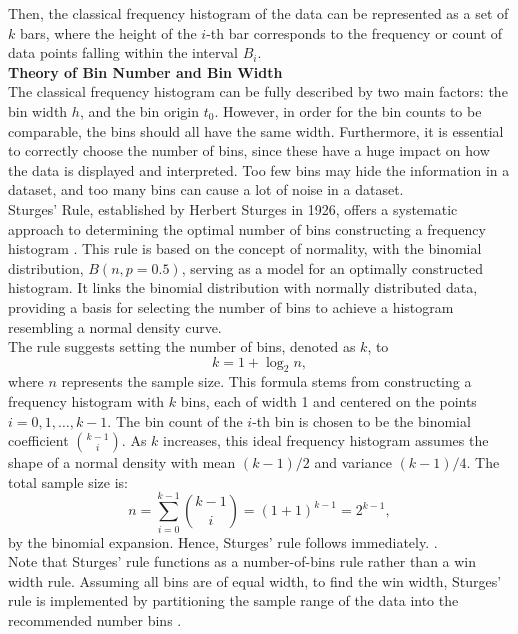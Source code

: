 \documentclass{article}\usepackage[]{graphicx}\usepackage[]{xcolor}
\numberwithin{equation}{section}
\begin{document}
\noindent Then, the classical frequency histogram of the data can be represented as a set of $k$ bars, where the height of the $i$-th bar corresponds to the frequency or count of data points falling within the interval $B_i$.\\

\noindent \textbf{Theory of Bin Number and Bin Width}\\
\noindent The classical frequency histogram can be fully described by two main factors: the bin width $h$, and the bin origin $t_{0}$. However, in order for the bin counts to be comparable, the bins should all have the same width. Furthermore, it is essential to correctly choose the number of bins, since these have a huge impact on how the data is displayed and interpreted. Too few bins may hide the information in a dataset, and too many bins can cause a lot of noise in a dataset.\\

\noindent Sturges' Rule, established by Herbert Sturges in 1926, offers a systematic approach to determining the optimal number of bins constructing a frequency histogram \cite{scott2015multivariate}. This rule is based on the concept of normality, with the binomial distribution, $B(n,p = 0.5)$, serving as a model for an optimally constructed histogram. It links the binomial distribution with normally distributed data, providing a basis for selecting the number of bins to achieve a histogram resembling a normal density curve.\\

\noindent The rule suggests setting the number of bins, denoted as $k$, to \[ k = 1 + \log_{2} n, \] where $n$ represents the sample size. This formula stems from constructing a frequency histogram with $k$ bins, each of width 1 and centered on the points $i = 0,1,\dots, k - 1$. The bin count of the $i$-th bin is chosen to be the binomial coefficient $\binom{k-1}{i}$. As $k$ increases, this ideal frequency histogram assumes the shape of a normal density with mean $(k - 1)/2$ and variance $(k - 1)/4$. The total sample size is:
\[ n = \sum_{i=0}^{k-1} \binom{k-1}{i} = (1+1)^{k-1} = 2^{k-1}, \]
by the binomial expansion. Hence, Sturges’ rule follows immediately. \cite{scott2015multivariate}.\\

\noindent Note that Sturges’ rule functions as a number-of-bins rule rather than a win  width rule. Assuming all bins are of equal width, to find the win  width, Sturges’ rule is implemented by partitioning the sample range of the data into the recommended number bins \cite{scott2015multivariate}.
\end{document}
